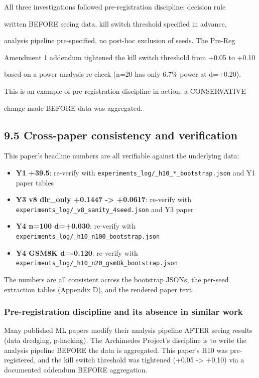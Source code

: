 \documentclass[
]{article}
\providecommand{\tightlist}{%
  \setlength{\itemsep}{0pt}\setlength{\parskip}{0pt}}
\begin{document}
All three investigations followed pre-registration discipline: decision
rule

written BEFORE seeing data, kill switch threshold specified in advance,

analysis pipeline pre-specified, no post-hoc exclusion of seeds. The
Pre-Reg

Amendment 1 addendum tightened the kill switch threshold from +0.05 to
+0.10

based on a power analysis re-check (n=20 has only 6.7\% power at
d=+0.20).

This is an example of pre-registration discipline in action: a
CONSERVATIVE

change made BEFORE data was aggregated.

\subsection{9.5 Cross-paper consistency and
verification}\label{cross-paper-consistency-and-verification}

This paper's headline numbers are all verifiable against the underlying
data:

\begin{itemize}
\tightlist
\item
  \textbf{Y1 +39.5}: re-verify with
  \texttt{experiments\_log/\_h10\_*\_bootstrap.json} and Y1 paper tables
\item
  \textbf{Y3 v8 dlr\_only +0.1447 -\textgreater{} +0.0617}: re-verify
  with \texttt{experiments\_log/\_v8\_sanity\_4seed.json} and Y3 paper
\item
  \textbf{Y4 n=100 d=+0.030}: re-verify with
  \texttt{experiments\_log/\_h10\_n100\_bootstrap.json}
\item
  \textbf{Y4 GSM8K d=-0.120}: re-verify with
  \texttt{experiments\_log/\_h10\_n20\_gsm8k\_bootstrap.json}
\end{itemize}

The numbers are all consistent across the bootstrap JSONs, the per-seed
extraction tables (Appendix D), and the rendered paper text.

\subsubsection{Pre-registration discipline and its absence in similar
work}\label{pre-registration-discipline-and-its-absence-in-similar-work}

Many published ML papers modify their analysis pipeline AFTER seeing
results (data dredging, p-hacking). The Archimedes Project's discipline
is to write the analysis pipeline BEFORE the data is aggregated. This
paper's H10 was pre-registered, and the kill switch threshold was
tightened (+0.05 -\textgreater{} +0.10) via a documented addendum BEFORE
aggregation.
\end{document}
